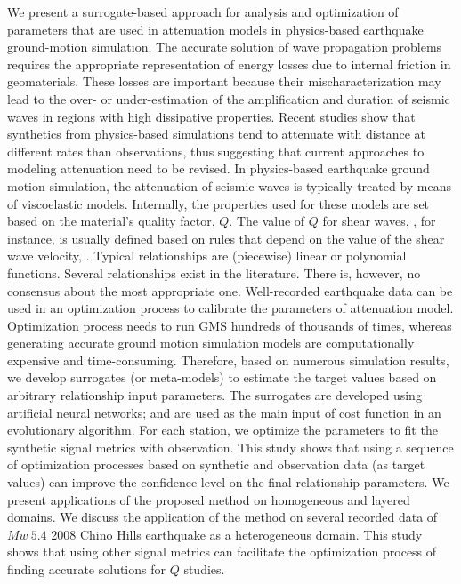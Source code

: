 %
We present a surrogate-based approach for analysis and optimization of parameters that are used in attenuation models in physics-based earthquake ground-motion simulation. The accurate solution of wave propagation problems requires the appropriate representation of energy losses due to internal friction in geomaterials. These losses are important because their mischaracterization may lead to the over- or under-estimation of the amplification and duration of seismic waves in regions with high dissipative properties. Recent studies show that synthetics from physics-based simulations tend to attenuate with distance at different rates than observations, thus suggesting that current approaches to modeling attenuation need to be revised. In physics-based earthquake ground motion simulation, the attenuation of seismic waves is typically treated by means of viscoelastic models. Internally, the properties used for these models are set based on the material's quality factor, $Q$. The value of $Q$ for shear waves, \qs{}, for instance, is usually defined based on rules that depend on the value of the shear wave velocity, \vs{}.  Typical \qsvs{} relationships are (piecewise) linear or polynomial functions. Several  \qsvs{} relationships exist in the literature. There is, however, no consensus about the most appropriate one.  Well-recorded earthquake data can be used in an optimization process to calibrate the parameters of attenuation model. Optimization process needs to run GMS hundreds of thousands of times, whereas generating accurate ground motion simulation models are computationally expensive and time-consuming. Therefore, based on numerous simulation results, we develop surrogates (or meta-models) to estimate the target values based on arbitrary \qsvs{} relationship input parameters. The surrogates are developed using artificial neural networks; and are used as the main input of cost function in an evolutionary algorithm.  For each station, we optimize the parameters to fit the synthetic signal metrics with observation. This study shows that using a sequence of optimization processes based on synthetic and observation data (as target values) can improve the confidence level on the final \qsvs{} relationship parameters. We present applications of the proposed method on homogeneous and layered domains. We discuss the application of the method on several recorded data of  $Mw ~5.4$ 2008 Chino Hills earthquake as a heterogeneous domain. This study shows that using other signal metrics can facilitate the optimization process of finding accurate solutions for $Q$ studies.




